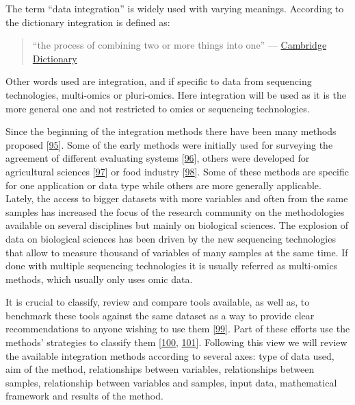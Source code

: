 \documentclass[
  12pt,
  a4paper,
  twoside,
  openright]{book}
\begin{document}
The term ``data integration'' is widely used with varying meanings.
According to the dictionary integration is defined as:

\begin{quote}
``the process of combining two or more things into one'' --- \href{https://dictionary.cambridge.org/dictionary/english/integration}{Cambridge Dictionary}
\end{quote}

Other words used are integration, and if specific to data from sequencing technologies, multi-omics or pluri-omics.
Here integration will be used as it is the more general one and not restricted to omics or sequencing technologies.

Since the beginning of the integration methods there have been many methods proposed {[}\protect\hyperlink{ref-krassowski2020}{95}{]}.
Some of the early methods were initially used for surveying the agreement of different evaluating systems {[}\protect\hyperlink{ref-yannakoudakis2015}{96}{]}, others were developed for agricultural sciences {[}\protect\hyperlink{ref-hotelling1936}{97}{]} or food industry {[}\protect\hyperlink{ref-biancolillo}{98}{]}.
Some of these methods are specific for one application or data type while others are more generally applicable.
Lately, the access to bigger datasets with more variables and often from the same samples has increased the focus of the research community on the methodologies available on several disciplines but mainly on biological sciences.
The explosion of data on biological sciences has been driven by the new sequencing technologies that allow to measure thousand of variables of many samples at the same time.
If done with multiple sequencing technologies it is usually referred as multi-omics methods, which usually only uses omic data.

It is crucial to classify, review and compare tools available, as well as, to benchmark these tools against the same dataset as a way to provide clear recommendations to anyone wishing to use them {[}\protect\hyperlink{ref-wu_selective_2019}{99}{]}.
Part of these efforts use the methods' strategies to classify them {[}\protect\hyperlink{ref-cavill2016}{100}, \protect\hyperlink{ref-chongComputationalApproachesIntegrative2017}{101}{]}.
Following this view we will review the available integration methods according to several axes: type of data used, aim of the method, relationships between variables, relationships between samples, relationship between variables and samples, input data, mathematical framework and results of the method.
\end{document}
